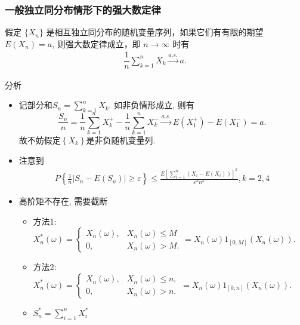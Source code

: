 \documentclass[Prob-All.tex]{subfiles}
\begin{document}
\begin{frame}
	\frametitle{一般独立同分布情形下的强大数定律}
		\begin{thm}
		假定 $\{X_n\}$ 是相互独立同分布的随机变量序列，如果它们有有限的期望 $E (X_n)=a$, 则强大数定律成立，即 $n\rightarrow\infty$ 时有
		\begin{eqnarray*}
			\dfrac{1}{n}\sum_{k=1}^nX_k\stackrel{a.s.}{\rightarrow} a.
		\end{eqnarray*}
	\end{thm}

	\pause





\end{frame}

\begin{frame}{分析}
	\begin{itemize}[<+-|alert@+>]
	\item 记部分和${S_{n}=\sum_{k=1}^{n} X_{k}}$. 如非负情形成立, 则有
	\[
	\frac{S_{n}}{n}=\frac{1}{n} \sum_{k=1}^{n} X_{k}^{+}-\frac{1}{n} \sum_{k=1}^{n} X_{k}^{-} \stackrel{a.s.}{\longrightarrow} E\left(X_{1}^{+}\right)-E\left(X_{1}^{-}\right)=a .
	\]
	故不妨假定${\left\{X_{k}\right\}}$是非负随机变量列.

	\item 注意到
	\begin{align*}
		P\left\{\frac{1}{n}\left|S_{n}-E\left(S_{n}\right)\right| \geq \varepsilon\right\} \leq \frac{E[\sum_{i=1}^n(X_i-E(X_i))]^k}{\varepsilon^{k}n^k}, k=2, 4%
	\end{align*}
	\item 高阶矩不存在, 需要截断

	\begin{itemize}[<+-|alert@+>]
	\item 方法1: $X_{n}^{*}(\omega)={\left\{\begin{array}{ll}
		X_{n}(\omega), &     X_{n}(\omega) \leq M \\
		0, &     X_{n}(\omega)>M .
		\end{array}=X_{n}(\omega) 1_{[0, M]}\left(X_{n}(\omega)\right) .\right.}$ %
	\item 方法2: $X_{n}^{*}(\omega)={\left\{\begin{array}{ll}
		X_{n}(\omega), &     X_{n}(\omega) \leq n, \\
		0, &     X_{n}(\omega)>n .
		\end{array}=X_{n}(\omega) 1_{[0, n]}\left(X_{n}(\omega)\right) .\right.}$
	\item $S_n^*=\sum_{i=1}^nX_i^*$
	\end{itemize}

	\end{itemize}
\end{frame}
\end{document}
